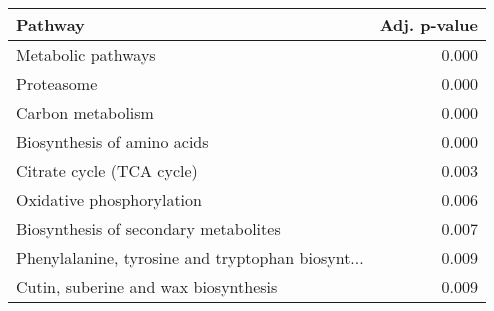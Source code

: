 \begin{tabular}{lr}
\toprule
                                           Pathway &  Adj. p-value \\
\midrule
                                Metabolic pathways &         0.000 \\
                                        Proteasome &         0.000 \\
                                 Carbon metabolism &         0.000 \\
                       Biosynthesis of amino acids &         0.000 \\
                         Citrate cycle (TCA cycle) &         0.003 \\
                         Oxidative phosphorylation &         0.006 \\
             Biosynthesis of secondary metabolites &         0.007 \\
 Phenylalanine, tyrosine and tryptophan biosynt... &         0.009 \\
              Cutin, suberine and wax biosynthesis &         0.009 \\
\bottomrule
\end{tabular}
